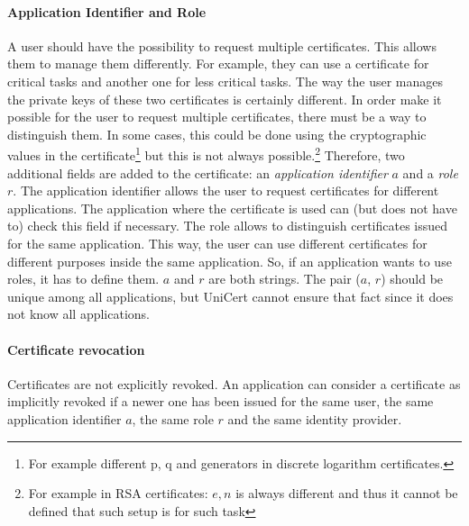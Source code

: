 \documentclass[bibtotoc,halfparskip,oneside]{scrreprt}
\begin{document}
	\paragraph*{Application Identifier and Role} A user should have the possibility to request multiple certificates. This allows them to manage them differently. For example, they can use a certificate for critical tasks and another one for less critical tasks. The way the user manages the private keys of these two certificates is certainly different. In order make it possible for the user to request multiple certificates, there must be a way to distinguish them. In some cases, this could be done using the cryptographic values in the certificate\footnote{For example different p, q and generators in discrete logarithm certificates.} but this is not always possible.\footnote{For example in RSA certificates: $e,n$ is always different and thus it cannot be defined that such setup is for such task} Therefore, two additional fields are added to the certificate: an \textit{application identifier} $a$ and a \textit{role} $r$. The application identifier allows the user to request certificates for different applications. The application where the certificate is used can (but does not have to) check this field if necessary. The role allows to distinguish certificates issued for the same application. This way, the user can use different certificates for different purposes inside the same application. So, if an application wants to use roles, it has to define them. $a$ and $r$ are both strings. The pair ($a$, $r$) should be unique among all applications, but UniCert cannot ensure that fact since it does not know all applications.
	
	\paragraph*{Certificate revocation} Certificates are not explicitly revoked. An application can consider a certificate as implicitly revoked if a newer one has been issued for the same user, the same application identifier $a$, the same role $r$ and the same identity provider.
	
	
\end{document}
